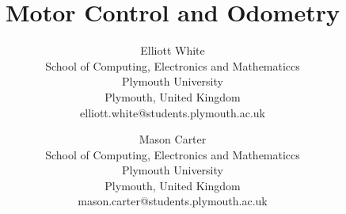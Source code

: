 \title{Motor Control and Odometry\\
}

\author{%
  Elliott White\\School of Computing, Electronics and Mathematiccs\\Plymouth University\\Plymouth, United Kingdom \\elliott.white@students.plymouth.ac.uk\\
  \and Mason Carter\\School of Computing, Electronics and Mathematiccs\\Plymouth University\\Plymouth, United Kingdom \\mason.carter@students.plymouth.ac.uk\\
}

\maketitle